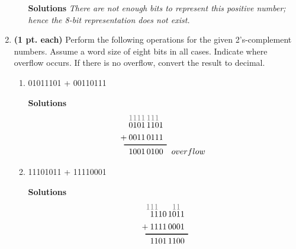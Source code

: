 \begin{enumerate}
\begin{enumerate}
                    \begin{onlysolution} \textbf{Solutions} \itshape{
                            There are not enough bits to represent this positive number; hence
                            the 8-bit representation does not exist.
                        }
                    \end{onlysolution}

            \end{enumerate}
            \filbreak
        \item \textbf{ (1 pt. each)} Perform the following operations for the given
            2's-complement numbers. Assume a word size of eight bits
            in all cases. Indicate where overflow occurs. If there is no overflow,
            convert the result to decimal.
            \begin{enumerate}

                \item 01011101 + 00110111

                    \begin{onlysolution} \textbf{Solutions}
                        \begin{align*}
                            {\color{gray}
                            1111\,111\0 }&\\[-1.5ex]
                            0101\,1101&\\
                            +\:0011\,0111&\\[-2ex]
                            \rule{12ex}{1pt}\hspace{-1ex}&\\[-1ex]
                            1001\,0100&\quad  overflow
                        \end{align*}
                    \end{onlysolution}

                \item 11101011 + 11110001

                    \begin{onlysolution} \textbf{Solutions}
                        \begin{align*}
                            {\color{gray}
                            111\0\0\911\0 }&\\[-1.5ex]
                            1110\,1011&\\
                            +\:1111\,0001&\\[-2ex]
                            \rule{12ex}{1pt}\hspace{-1ex}&\\[-1ex]
                            1101\,1100&
                        \end{align*}
                    \end{onlysolution}


\end{enumerate}
\end{enumerate}
